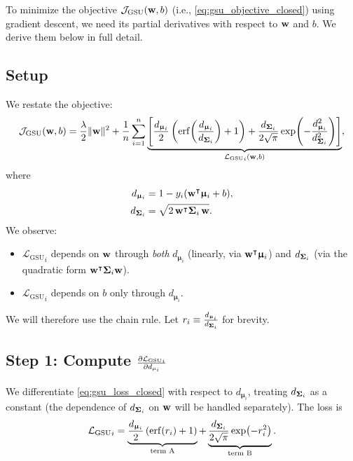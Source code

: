 \documentclass[11pt, letterpaper]{article}
\newcommand{\bSigma}{\vb{\Sigma}}
\newcommand{\bmu}{\boldsymbol{\upmu}}
\newcommand{\loss}{\mathcal{L}}
\newcommand{\obj}{\mathcal{J}}
\begin{document}
To minimize the objective $\obj_{\text{GSU}} (\vb{w}, b)$ (i.e., \cref{eq:gsu_objective_closed}) using gradient descent, we need its partial derivatives with respect to $\vb{w}$ and $b$. We derive them below in full detail.

\subsection{Setup}

We restate the objective:
\begin{equation}\label{eq:gsu_obj_restate}
    \obj_{\text{GSU}} (\vb{w}, b) = \frac{\lambda}{2}\|\vb{w}\|^2 + \frac{1}{n}\sum_{i=1}^{n}\underbrace{\left[\frac{d_{\bmu_i}}{2}\left(\mathrm{erf}\!\left(\frac{d_{\bmu_i}}{d_{\bSigma_i}}\right) + 1\right) + \frac{d_{\bSigma_i}}{2\sqrt{\pi}}\exp\!\left(-\frac{d_{\bmu_i}^2}{d_{\bSigma_i}^2}\right)\right]}_{{\loss_{\text{GSU}}}_{i}(\vb{w}, b)},
\end{equation}
where
\begin{align*}
    d_{\bmu_i} &= 1 - y_i(\vb{w}^{\intercal} \bmu_i + b), \\
    d_{\bSigma_i} &= \sqrt{2\, \vb{w}^{\intercal} \bSigma_i\, \vb{w}}.
\end{align*}
We observe:
\begin{itemize}[leftmargin=2em]
    \item ${\loss_{\text{GSU}}}_{i}$ depends on $\vb{w}$ through \emph{both} $d_{\bmu_i}$ (linearly, via $\vb{w}^{\intercal}\bmu_i$) and $d_{\bSigma_i}$ (via the quadratic form $\vb{w}^{\intercal}\bSigma_i\vb{w}$).
    \item ${\loss_{\text{GSU}}}_{i}$ depends on $b$ only through $d_{\bmu_i}$.
\end{itemize}
We will therefore use the chain rule. Let $r_i \equiv \frac{d_{\bmu_i}}{d_{\bSigma_i}}$ for brevity.

\subsection{Step 1: Compute $\pdv{{\loss_{\text{GSU}}}_{i}}{d_{\mu_i}}$}

We differentiate \cref{eq:gsu_loss_closed} with respect to $d_{\bmu_i}$, treating $d_{\bSigma_i}$ as a constant (the dependence of $d_{\bSigma_i}$ on $\vb{w}$ will be handled separately). The loss is
\begin{equation}
    {\loss_{\text{GSU}}}_{i} = \underbrace{\frac{d_{\bmu_i}}{2}\left(\mathrm{erf}(r_i) + 1\right)}_{\text{term A}} + \underbrace{\frac{d_{\bSigma_i}}{2\sqrt{\pi}}\exp(-r_i^2)}_{\text{term B}}.
\end{equation}
\end{document}

